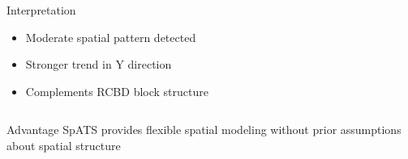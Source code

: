 \documentclass[aspectratio=43]{beamer}
\begin{document}
\begin{frame}
\begin{columns}[T]
\begin{column}{0.5\textwidth}
            \begin{block}{Interpretation}
                \begin{itemize}
                    \item Moderate spatial pattern detected
                    \item Stronger trend in Y direction
                    \item Complements RCBD block structure
                \end{itemize}
            \end{block}
        \end{column}
    \end{columns}
    
    \vspace{1em}
    
    \begin{exampleblock}{Advantage}
        SpATS provides flexible spatial modeling without prior assumptions about spatial structure
    \end{exampleblock}
\end{frame}
\end{document}
